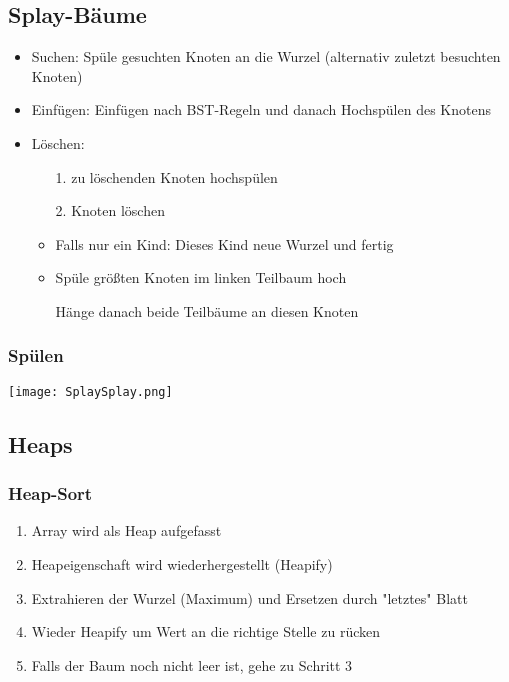     \subsection{Splay-Bäume}
            \begin{itemize}
                \item Suchen: Spüle gesuchten Knoten an die Wurzel (alternativ zuletzt besuchten Knoten)
                \item Einfügen: Einfügen nach BST-Regeln und danach Hochspülen des Knotens
                \item Löschen:
                    \begin{itemize}
                        \item[1.] zu löschenden Knoten hochspülen
                        \item[2.] Knoten löschen
                        \item Falls nur ein Kind: Dieses Kind neue Wurzel und fertig
                        \item {}  Spüle größten Knoten im linken Teilbaum hoch
                        \item[] {\makebox[3cm][l]{}} Hänge danach beide Teilbäume an diesen Knoten
                    \end{itemize}
            \end{itemize}

        \subsubsection{Spülen}
            \centerline{\texttt{[image: SplaySplay.png]}}

    \subsection{Heaps}
        \subsubsection{Heap-Sort}
            \begin{enumerate}
                \item Array wird als Heap aufgefasst
                \item Heapeigenschaft wird wiederhergestellt (Heapify)
                \item Extrahieren der Wurzel (Maximum) und Ersetzen durch \string"letztes\string" Blatt
                \item Wieder Heapify um Wert an die richtige Stelle zu rücken
                \item Falls der Baum noch nicht leer ist, gehe zu Schritt 3
            \end{enumerate}

